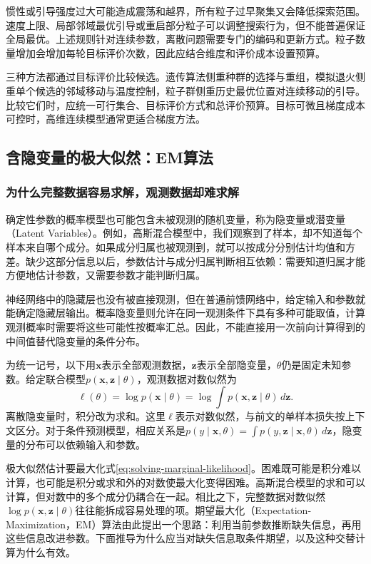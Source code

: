惯性或引导强度过大可能造成震荡和越界，所有粒子过早聚集又会降低探索范围。速度上限、局部邻域最优引导或重启部分粒子可以调整搜索行为，但不能普遍保证全局最优。上述规则针对连续参数，离散问题需要专门的编码和更新方式。粒子数量增加会增加每轮目标评价次数，因此应结合维度和评价成本设置预算。

三种方法都通过目标评价比较候选。遗传算法侧重种群的选择与重组，模拟退火侧重单个候选的邻域移动与温度控制，粒子群侧重历史最优位置对连续移动的引导。比较它们时，应统一可行集合、目标评价方式和总评价预算。目标可微且梯度成本可控时，高维连续模型通常更适合梯度方法。

\subsection{含隐变量的极大似然：EM算法}

\subsubsection{为什么完整数据容易求解，观测数据却难求解}
确定性参数的概率模型也可能包含未被观测的随机变量，称为隐变量或潜变量（Latent Variables）。例如，高斯混合模型中，我们观察到了样本，却不知道每个样本来自哪个成分。如果成分归属也被观测到，就可以按成分分别估计均值和方差。缺少这部分信息以后，参数估计与成分归属判断相互依赖：需要知道归属才能方便地估计参数，又需要参数才能判断归属。

神经网络中的隐藏层也没有被直接观测，但在普通前馈网络中，给定输入和参数就能确定隐藏层输出。概率隐变量则允许在同一观测条件下具有多种可能取值，计算观测概率时需要将这些可能性按概率汇总。因此，不能直接用一次前向计算得到的中间值替代隐变量的条件分布。

为统一记号，以下用$\bm x$表示全部观测数据，$\bm z$表示全部隐变量，$\theta$仍是固定未知参数。给定联合模型$p(\bm x,\bm z\mid\theta)$，观测数据对数似然为
\begin{equation}
 \ell(\theta)=\log p(\bm x\mid\theta)
 =\log\int p(\bm x,\bm z\mid\theta)\,d\bm z.
 \label{eq:solving-marginal-likelihood}
\end{equation}
离散隐变量时，积分改为求和。这里$\ell$表示对数似然，与前文的单样本损失按上下文区分。对于条件预测模型，相应关系是$p(y\mid\bm x,\theta)=\int p(y,\bm z\mid\bm x,\theta)\,d\bm z$，隐变量的分布可以依赖输入和参数。

极大似然估计要最大化式\eqref{eq:solving-marginal-likelihood}。困难既可能是积分难以计算，也可能是积分或求和外的对数使最大化变得困难。高斯混合模型的求和可以计算，但对数中的多个成分仍耦合在一起。相比之下，完整数据对数似然$\log p(\bm x,\bm z\mid\theta)$往往能拆成容易处理的项。期望最大化（Expectation-Maximization，EM）算法由此提出一个思路：利用当前参数推断缺失信息，再用这些信息改进参数。下面推导为什么应当对缺失信息取条件期望，以及这种交替计算为什么有效。

